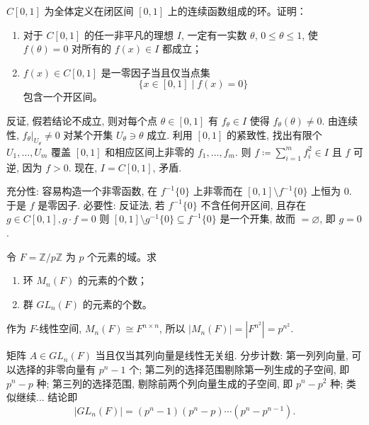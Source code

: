 \setcounter{pb}{43}

\begin{problem}
    $C[0,1]$ 为全体定义在闭区间 $[0,1]$ 上的连续函数组成的环。证明：

\begin{enumerate}[label=(\roman*)]
    \item 对于 $ C[0,1] $ 的任一非平凡的理想 $ I $, 一定有一实数 $ \theta $, $ 0 \leq \theta \leq 1 $, 使 $ f(\theta) = 0 $ 对所有的 $ f(x) \in I $ 都成立；
    \item $ f(x) \in C[0,1] $ 是一零因子当且仅当点集
    \[
    \{ x \in [0,1] \mid f(x) = 0 \}
    \]
    包含一个开区间。
\end{enumerate}

\end{problem}

\begin{solution}
    反证, 假若结论不成立, 则对每个点 $\theta\in[0,1]$ 有 $f_{\theta}\in I$ 使得 $f_{\theta}(\theta)\ne0$. 
    由连续性, $\left.{f_{\theta}}\right|_{U_{\theta}}^{}\ne0$ 对某个开集 $U_{\theta}\ni\theta$ 成立. 
    利用 $[0,1]$ 的紧致性, 找出有限个 $U_{1},\dots,U_{m}$ 覆盖 $[0,1]$ 和相应区间上非零的 $f_{1},\dots,f_{m}$. 
    则 $f \coloneqq \sum_{i=1}^{m}f_{i}^{2}\in I$ 且 $f$ 可逆, 因为 $f>0$. 
    现在, $I=C[0,1]$, 矛盾. 
    \par 充分性: 容易构造一个非零函数, 在 $f^{-1}\{0\}$ 上非零而在 $[0,1]\setminus f^{-1}\{0\}$ 上恒为 $0$. 
    于是 $f$ 是零因子.
    必要性: 反证法, 若 $f^{-1}\{0\}$ 不含任何开区间, 且存在 $g\in C[0,1], g\cdot f=0$ 则 $[0,1]\setminus g^{-1}\{0\}\subseteq f^{-1}\{0\}$ 
    是一个开集, 故而 $=\varnothing$, 即 $g=0$.
\end{solution}

\begin{problem}
    令 $ F = \mathbb{Z}/p\mathbb{Z} $ 为 $ p $ 个元素的域。求
    \begin{enumerate}[label=(\roman*)]
        \item 环 $ M_n(F) $ 的元素的个数；
        \item 群 $ GL_n(F) $ 的元素的个数。
    \end{enumerate}
\end{problem}

\begin{solution}
    作为 $F$-线性空间, $M_{n}(F)\cong F^{n\times n}$, 所以 $|M_{n}(F)|=|F^{n^{2}}|=p^{n^{2}}$. 
    \par 矩阵 $A\in GL_{n}(F)$ 当且仅当其列向量是线性无关组. 分步计数: 第一列列向量, 可以选择的非零向量有 $p^{n}-1$ 个; 
    第二列的选择范围剔除第一列生成的子空间, 即 $p^{n}-p$ 种; 第三列的选择范围, 剔除前两个列向量生成的子空间, 即 $p^{n}-p^{2}$ 种; 
    类似继续... 结论即
        \[
            |GL_{n}(F)|=(p^{n}-1)(p^{n}-p)\cdots(p^{n}-p^{n-1}).
        \]
\end{solution}

